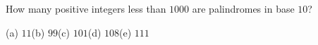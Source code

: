 How many positive integers less than $1000$ are palindromes in base $10$?

(a) $11$\quad (b) $99$\quad (c) $101$\quad (d) $108$\quad (e) $111$
